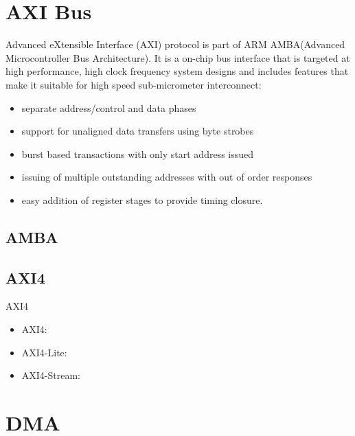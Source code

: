 \section{AXI Bus}
\label{sec:AXI Bus}

Advanced eXtensible Interface (AXI) protocol is part of ARM AMBA(Advanced Microcontroller Bus Architecture).
It is a on-chip bus interface that is targeted at high performance, high clock frequency system designs and includes features that make it suitable for high speed sub-micrometer interconnect:
\begin{itemize}
\item separate address/control and data phases
\item support for unaligned data transfers using byte strobes
\item burst based transactions with only start address issued
\item issuing of multiple outstanding addresses with out of order responses
\item easy addition of register stages to provide timing closure.
\end{itemize}

\subsection{AMBA}
\label{subsec:AMBA}

 
\subsection{AXI4}
\label{subsec:AXI4}
AXI4 
\begin{itemize}
\item AXI4:
\item AXI4-Lite:
\item AXI4-Stream:
\end{itemize}





\section{DMA}
\label{sec:DMA}

